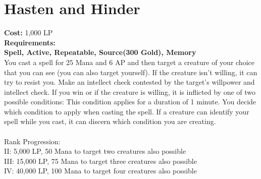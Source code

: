 \section{Hasten and Hinder}\label{spell:hastenHinder}
\textbf{Cost:} 1,000 LP\\
\textbf{Requirements:}\\
\textbf{Spell, Active, Repeatable, Source(300 Gold), Memory}\\
You cast a spell for 25 Mana and 6 AP and then target a creature of your choice that you can see (you can also target yourself).
If the creature isn't willing, it can try to resist you.
Make an intellect check contested by the target's willpower and intellect check.
If you win or if the creature is willing, it is inflicted by one of two possible conditions:%
This condition applies for a duration of 1 minute.
You decide which condition to apply when casting the spell.
If a creature can identify your spell while you cast, it can discern which condition you are creating.\\
\\
Rank Progression:\\
II: 5,000 LP, 50 Mana to target two creatures also possible\\
III: 15,000 LP, 75 Mana to target three creatures also possible\\
IV: 40,000 LP, 100 Mana to target four creatures also possible \\